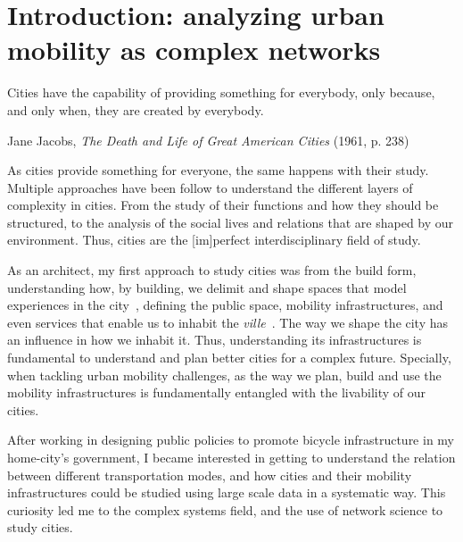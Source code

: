 \chapter{Introduction: analyzing urban mobility as complex networks}

\epigraph{Cities have the capability of providing something for everybody, only because, and only when, they are created by everybody.}{Jane Jacobs, \textit{The Death and Life of Great American Cities} (1961, p. 238)}

As cities provide something for everyone, the same happens with their study. Multiple approaches have been follow to understand the different layers of complexity in cities. From the study of their functions and how they should be structured, to the analysis of the social lives and relations that are shaped by our environment. Thus, cities are the [im]perfect interdisciplinary field of study.

As an architect, my first approach to study cities was from the build form, understanding how, by building, we delimit and shape spaces that model experiences in the city~\cite{ghel1971life}, defining the public space, mobility infrastructures, and even services that enable us to inhabit the \textit{ville}~\cite{sennett2018building}. The way we shape the city has an influence in how we inhabit it. Thus, understanding its infrastructures is fundamental to understand and plan better cities for a complex future. Specially, when tackling urban mobility challenges, as the way we plan, build and use the mobility infrastructures is fundamentally entangled with the livability of our cities.

After working in designing public policies to promote bicycle infrastructure in my home-city's government, I became interested in getting to understand the relation between different transportation modes, and how cities and their mobility infrastructures could be studied using large scale data in a systematic way. This curiosity led me to the complex systems field, and the use of network science to study cities.



